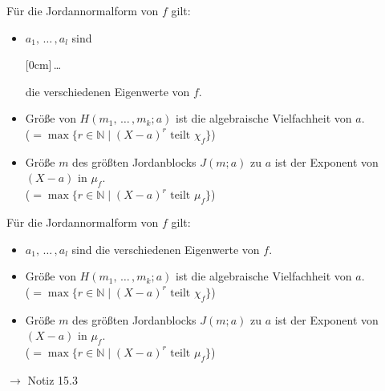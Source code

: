 \documentclass[11pt]{article}
\renewcommand{\cite}[1]{\par\bigskip\hfill{\color{gray}\tiny\(\to\) #1}}
\newcommand{\NN}{\mathbb{N}}
\newcommand{\hide}[1]{\parbox{0cm}{\raisebox{-7pt}[0cm]{\dots}}\color{white}#1\color{black}}
\let\olddots\dots
\renewcommand{\dots}{\,\olddots\,}
\newenvironment{field}{}{\newpage}
\newif\ifnote
\newenvironment{note}{\notetrue}{\notefalse}
\newcommand{\localtag}{}
\newcommand{\globaltag}{}
\newcommand{\uuid}{}
\newcommand{\tags}[1]{
    \ifnote
        \renewcommand{\localtag}{#1}
    \else
        \renewcommand{\globaltag}{#1}
    \fi
    }
\newcommand{\xplain}[1]{\renewcommand{\uuid}{#1}}
\begin{document}
\begin{note}
    \tags{Satz}
    \xplain{c22833e4-8610-427a-8142-05abf2f142c1}

    \begin{field}
        Für die Jordannormalform von $f$ gilt:
        \begin{itemize}
            \item $a_1,\dots,a_l$ sind \hide{die verschiedenen Eigenwerte von $f$.}
            \item Größe von $H(m_1,\dots,m_k;a)$ ist die algebraische Vielfachheit von $a$.\\
            ($= \max\{r\in \NN \mid (X-a)^r \text{ teilt } \chi_f\}$)
            \item Größe $m$ des größten Jordanblocks $J(m;a)$ zu $a$ ist der Exponent von $(X-a)$ in $\mu_f$.\\
            ($= \max\{r\in \NN \mid (X-a)^r \text{ teilt } \mu_f\}$)
        \end{itemize}
    \end{field}
    \begin{field}
        Für die Jordannormalform von $f$ gilt:
        \begin{itemize}
            \item $a_1,\dots,a_l$ sind die verschiedenen Eigenwerte von $f$.
            \item Größe von $H(m_1,\dots,m_k;a)$ ist die algebraische Vielfachheit von $a$.\\
            ($= \max\{r\in \NN \mid (X-a)^r \text{ teilt } \chi_f\}$)
            \item Größe $m$ des größten Jordanblocks $J(m;a)$ zu $a$ ist der Exponent von $(X-a)$ in $\mu_f$.\\
            ($= \max\{r\in \NN \mid (X-a)^r \text{ teilt } \mu_f\}$)
        \end{itemize}
        \cite{Notiz 15.3}
    \end{field}


\end{note}
\end{document}
